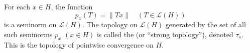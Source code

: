 \begin{definition}
For each $x \in H$, the function
$$p_x(T) = \|Tx\| \quad (T \in \mathcal{L}(H))$$
is a seminorm on $\mathcal{L}(H)$. The topology on $\mathcal{L}(H)$ generated by the set of all such seminorms $p_x$ $(x \in H)$ is called the  (or ``strong topology''), denoted $\tau_s$. This is the topology of pointwise convergence on $H$.
\end{definition}

